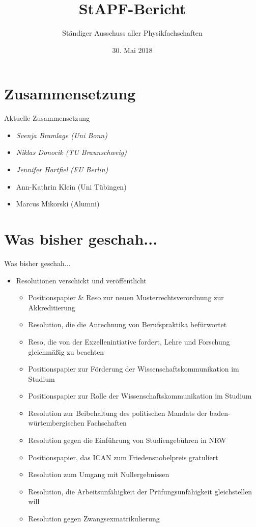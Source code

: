 \documentclass[compress, aspectratio=169]{beamer}
\title[StAPf-Bericht]{StAPF-Bericht}
\author{Ständiger Ausschuss aller Physikfachschaften}
\institute[Zusammenkunft aller Physikfachschaften]
\date{30. Mai 2018}
\begin{document}
\begin{frame}[plain]{}
  \titlepage
\end{frame}

\section{Zusammensetzung}

\begin{frame}{Aktuelle Zusammensetzung}
  \begin{itemize}
  \item \emph{Svenja Bramlage (Uni Bonn)}
  \item \emph{Niklas Donocik (TU Braunschweig)}
  \item \emph{Jennifer Hartfiel (FU Berlin)}
  \item Ann-Kathrin Klein (Uni Tübingen)
  \item Marcus Mikorski (Alumni)
  \end{itemize}
\end{frame}

\section{Was bisher geschah...}

\begin{frame}{Was bisher geschah...}
  \begin{itemize}
  \item Resolutionen verschickt und veröffentlicht
    \begin{itemize}
        \item Positionspapier \& Reso zur neuen Musterrechtsverordnung zur Akkreditierung
        \item Resolution, die die Anrechnung von Berufspraktika befürwortet
        \item Reso, die von der Exzellenintiative fordert, Lehre und Forschung gleichmäßig zu beachten
        \item Positionspapier zur Förderung der Wissenschaftskommunikation im Studium
        \item Positionspapier zur Rolle der Wissenschaftskommunikation im Studium        
        \item Resolution zur Beibehaltung des politischen Mandats der baden-würtembergischen Fachschaften
        \item Resolution gegen die Einführung von Studiengebühren in NRW
        \item Positionspapier, das ICAN zum Friedensnobelpreis gratuliert
        \item Resolution zum Umgang mit Nullergebnissen
        \item Resolution, die Arbeitsunfähigkeit der Prüfungsunfähigkeit gleichstellen will
        \item Resolution gegen Zwangsexmatrikulierung
    \end{itemize}
  \end{itemize}
\end{frame}
\end{document}

